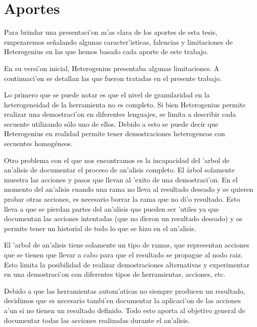 \chapter{Aportes}

Para brindar una presentaci'on m'as clara de los aportes de esta tesis, empezaremos se\~nalando algunas caracter'isticas, falencias y limitaciones de Heterogenius en las que hemos basado cada aporte de este trabajo.

En su versi'on inicial, Heterogenius presentaba algunas limitaciones. 
A continuaci'on se detallan las que fueron tratadas en el presente trabajo.

Lo primero que se puede notar es que el nivel de granularidad en la heterogeneidad de la herramienta no es completo. 
Si bien Heterogenius permite realizar una demostraci'on en diferentes lenguajes, se limita a describir cada secuente utilizando sólo uno de ellos. 
Debido a esto se puede decir que Heterogenius en realidad permite tener demostraciones heterogeneas con secuentes homogéneos. 

Otro problema con el que nos encontramos es la incapacidad del 'arbol de an'alisis de documentar el proceso de an'alisis completo. El árbol solamente muestra las acciones y pasos que llevan al 'exito de una demostraci'on. En el momento del an'alisis cuando una rama no lleva al resultado deseado y se quieren probar otras acciones, es necesario borrar la rama que no di'o resultado. Esto lleva a que se pierdan partes del an'alisis que pueden ser 'utiles ya que documentan las acciones intentadas (que no dieron un resultado deseado) y os permite tener un historial de todo lo que se hizo en el an'alisis.

El 'arbol de an'alisis tiene solamente un tipo de ramas, que representan acciones que se tienen que llevar a cabo para que el resultado se propague al nodo raiz. Esto limita la posibilidad de realizar demostraciones alternativas y experimentar en una demostraci'on con diferentes tipos de herramientas, acciones, etc.

Debido a que las herramientas autom'aticas no siempre producen un resultado, decidimos que es necesario tambi'en documentar la aplicaci'on de las acciones a'un si no tienen un resultado definido. Todo esto aporta al objetivo general de documentar todas las acciones realizadas durante el an'alisis.









